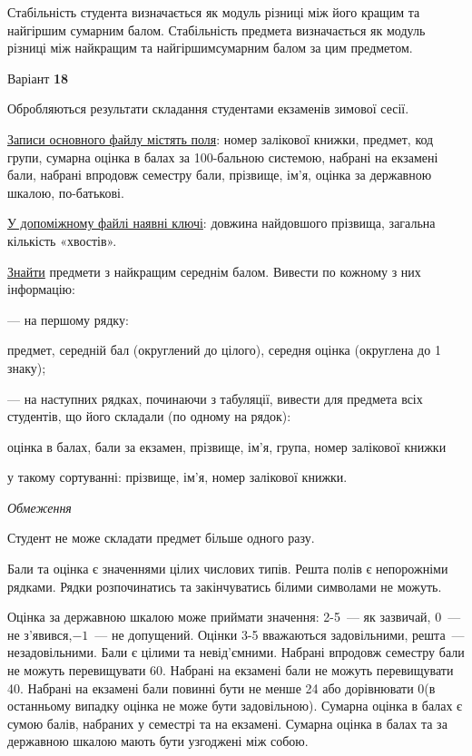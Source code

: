 \documentclass[11pt, ukrainian]{article}
\begin{document}
Стабільність студента визначається як модуль різниці між його кращим та найгіршим сумарним балом.
Стабільність предмета визначається як модуль різниці між найкращим та найгіршимсумарним балом за цим предметом.




\par
\newpage
{\center Варіант  \No \textbf { 18 }\par}
\bigskip
Обробляються результати складання студентами екзаменів зимової сесії.

\underline{Записи основного файлу містять поля}: номер залікової книжки, предмет, код групи, сумарна оцінка в балах за 100-бальною системою, набрані на екзамені бали, набрані впродовж семестру бали, прізвище, ім’я, оцінка за державною шкалою, по-батькові.

\underline{У допоміжному файлі наявні ключі}: довжина найдовшого прізвища, загальна кількість «хвостів».

\underline{Знайти} предмети з найкращим середнім балом. Вивести по кожному з них інформацію:\par
{\noindent}--- на першому рядку:\par
предмет, середній бал (округлений до цілого), середня оцінка (округлена до 1 знаку);

{\noindent}--- на наступних рядках, починаючи з табуляції, вивести для предмета всіх студентів, що його складали (по одному на рядок):\par
оцінка в балах, бали за екзамен, прізвище, ім’я, група, номер залікової книжки

{\noindent}у такому сортуванні: прізвище, ім’я, номер залікової книжки.


\bigskip\textit{Обмеження}

Студент не може складати предмет більше одного разу.

Бали та оцінка є значеннями цілих числових типів. Решта полів є непорожніми рядками.
Рядки розпочинатись та закінчуватись білими символами не можуть.

Оцінка за державною шкалою може приймати значення: 2-5~--- як зазвичай, 0~--- не з’явився,$-1$~--- не допущений. 
Оцінки 3-5 вважаються задовільними, решта~--- незадовільними. 
Бали є цілими та невід’ємними.
Набрані впродовж семестру бали не можуть перевищувати 60. 
Набрані на екзамені бали не можуть перевищувати 40. 
Набрані на екзамені бали повинні бути не менше 24 або дорівнювати 0(в останньому випадку оцінка не може бути задовільною). 
Сумарна оцінка в балах є сумою балів, набраних у семестрі та на екзамені.
Сумарна оцінка в балах та за державною шкалою мають бути узгоджені між собою.
\end{document}
